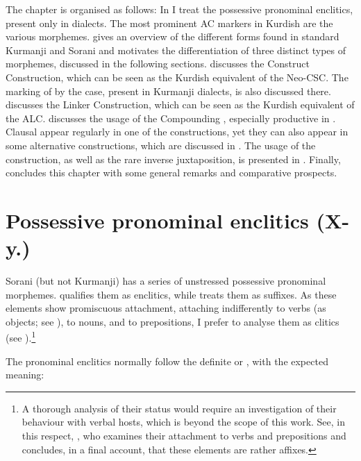 The chapter is organised as follows: In  I treat the possessive pronominal enclitics, present only in \Sor dialects.  The most prominent AC markers in Kurdish are the various \ez* morphemes.   gives an overview of the  different forms found in standard Kurmanji and Sorani and motivates the differentiation of three distinct types of \ez* morphemes, discussed in the following sections.  discusses the Construct \ez* Construction, which can be seen as the Kurdish equivalent of the  Neo-CSC. The marking of \secns by the \obl* case, present in Kurmanji dialects, is also discussed there.
 discusses the Linker \ez* Construction, which can be seen as the Kurdish equivalent of the  ALC. 
 discusses the usage of the Compounding \ez*, especially productive in \Sor. 
Clausal \secns appear regularly in one of the \ez* constructions, yet they can also appear in some alternative constructions, which are discussed in .
The usage of the  construction, as well as the rare {inverse juxtaposition}, is presented in .
Finally,  concludes this chapter with some general remarks and comparative prospects. 

\largerpage
\section{Possessive pronominal enclitics (X-y.\poss)} \label{ss:Kurd_poss}
\label{ss:Kur_Poss}

Sorani (but not Kurmanji) has a series of unstressed possessive pronominal morphemes. \citet[15]{ThackstonSorani} qualifies them as enclitics, while \citet[76]{MacKenzie} treats them as suffixes. As these elements show promiscuous attachment, attaching indifferently to verbs (as objects; see \cite[37]{ThackstonSorani}), to nouns, and to prepositions, I prefer to analyse them as clitics (see ).\footnote{A thorough analysis of their status would require an investigation of their behaviour with verbal hosts, which is beyond the scope of this work. See, in this respect, \citet{SamvelianClitics}, who examines their attachment to verbs and prepositions and concludes, in a final account, that these elements are rather affixes.} 

The pronominal enclitics normally follow the definite or , with the expected meaning: 

